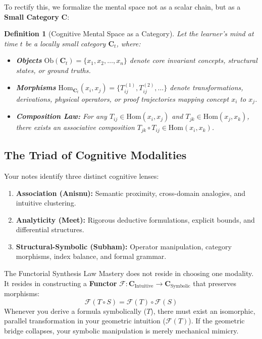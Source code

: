 \documentclass[11pt,a4paper]{article}
\newtheorem{definition}{Definition}[section]
\begin{document}
To rectify this, we formalize the mental space not as a scalar chain, but as a \textbf{Small Category} $\mathbf{C}$:

\begin{definition}[Cognitive Mental Space as a Category]
Let the learner's mind at time $t$ be a locally small category $\mathbf{C}_t$, where:
\begin{itemize}
    \item \textbf{Objects} $\mathrm{Ob}(\mathbf{C}_t) = \{x_1, x_2, \dots, x_n\}$ denote core invariant concepts, structural states, or ground truths.
    \item \textbf{Morphisms} $\mathrm{Hom}_{\mathbf{C}_t}(x_i, x_j) = \{T_{ij}^{(1)}, T_{ij}^{(2)}, \dots\}$ denote transformations, derivations, physical operators, or proof trajectories mapping concept $x_i$ to $x_j$.
    \item \textbf{Composition Law:} For any $T_{ij} \in \mathrm{Hom}(x_i, x_j)$ and $T_{jk} \in \mathrm{Hom}(x_j, x_k)$, there exists an associative composition $T_{jk} \circ T_{ij} \in \mathrm{Hom}(x_i, x_k)$.
\end{itemize}
\end{definition}

\subsection{The Triad of Cognitive Modalities}
Your notes identify three distinct cognitive lenses:
\begin{enumerate}
    \item \textbf{Association (Anisnu):} Semantic proximity, cross-domain analogies, and intuitive clustering.
    \item \textbf{Analyticity (Meet):} Rigorous deductive formulations, explicit bounds, and differential structures.
    \item \textbf{Structural-Symbolic (Subham):} Operator manipulation, category morphisms, index balance, and formal grammar.
\end{enumerate}

\begin{principlebox}{The Functorial Synthesis Law}
Mastery does not reside in choosing one modality. It resides in constructing a \textbf{Functor} $\mathcal{F}: \mathbf{C}_{\text{Intuitive}} \to \mathbf{C}_{\text{Symbolic}}$ that preserves morphisms:
\[
\mathcal{F}(T \circ S) = \mathcal{F}(T) \circ \mathcal{F}(S)
\]
Whenever you derive a formula symbolically ($T$), there must exist an isomorphic, parallel transformation in your geometric intuition ($\mathcal{F}(T)$). If the geometric bridge collapses, your symbolic manipulation is merely mechanical mimicry.
\end{principlebox}
\end{document}
